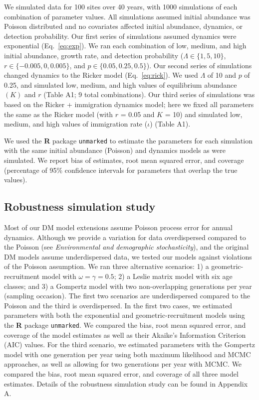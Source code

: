 \documentclass[12pt,english]{article}
\begin{document}
\begin{spacing}{1.9}
\begin{flushleft}
We simulated data for 100 sites over 40 years, with 1000 simulations of 
each combination of parameter values.  All
simulations assumed initial abundance was Poisson distributed
and no covariates affected initial abundance, dynamics, or
detection probability.  Our first series of simulations
assumed dynamics were exponential (Eq.~\ref{eq:exp}).  We ran 
each combination of low, medium, and high initial abundance, 
growth rate, and detection probability ($\Lambda \in
\{1,5,10\}$, $r \in \{-0.005, 0, 0.005\}$, and
 $p \in \{0.05, 0.25, 0.5\}$). 
Our second series of simulations changed dynamics to the Ricker
model (Eq.~\ref{eq:rick}). We used $\Lambda$ of 10 and $p$
of 0.25, and simulated low, medium, and high values of equilibrium
abundance $(K)$ and $r$ (Table A1;
9 total combinations). Our third series of simulations was based
on the Ricker + immigration dynamics model; here we fixed all
parameters the same as the Ricker model (with $r$ = 0.05 and $K$ = 10) and
simulated low, medium, and high values of immigration rate ($\iota$) (Table A1).

We used the \textbf{R} package \texttt{unmarked} to estimate the parameters 
for each simulation with the same
initial abundance (Poisson) and dynamics models as were simulated.
We report bias of estimates, root
mean squared error, and coverage (percentage of 95\% confidence
intervals for parameters that overlap the true values).

\subsection*{Robustness simulation study}

Most of our DM model extensions assume Poisson process error for annual dynamics.
Although we provide a variation for data overdispersed compared to the Poisson (see \textit{Environmental and demographic stochasticity}), 
and the original DM models assume underdispersed data,  
we tested our models against violations of the Poisson assumption.  
We ran three alternative scenarios: 1) a geometric-recruitment model with
$\omega = \gamma = 0.5$; 2) a Leslie matrix model with six age classes; and 3) 
a Gompertz model with two non-overlapping generations per year (sampling occasion).   
The first two scenarios are underdispersed compared to the Poisson and the third is overdispersed.
In the first two cases, we estimated parameters with both the exponential and geometric-recruitment
models using the \textbf{R} package \texttt{unmarked}.  We compared the bias,
root mean squared error, and coverage of the model estimates as well as their Akaike's Information
Criterion (AIC) values.
For the third scenario, we estimated parameters with the Gompertz model with 
one generation per year using both maximum likelihood and MCMC approaches, as well
as allowing for two generations per year with MCMC.  We compared the bias, root mean
squared error, and coverage of all three model estimates.  Details of the robustness simulation
study can be found in Appendix A.


\end{flushleft}
\end{spacing}
\end{document}
